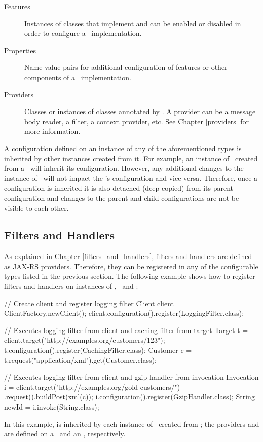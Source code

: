 \begin{description}
\item [Features] Instances of classes that implement  and can be enabled or disabled in order to configure a \jaxrs\ implementation.
\item [Properties] Name-value pairs for additional configuration of features or other components of a \jaxrs\ implementation.
\item [Providers] Classes or instances of classes annotated by \Provider. A provider can be a message body reader, a filter, a context provider, etc. See Chapter \ref{providers} for more information.
\end{description}

A configuration defined on an instance of any of the aforementioned types is inherited by other instances created from it. For example, an instance of \Target\ created from a \Client\ will inherit its configuration. However, any additional changes to the instance of \Target\ will not impact the \Client's configuration and vice versa. Therefore, once a configuration is inherited it is also detached (deep copied) from its parent configuration and changes to the parent and child configurations are not be visible to each other.

\subsection{Filters and Handlers}
\label{filters_handlers_client}

As explained in Chapter \ref{filters_and_handlers}, filters and handlers are defined as JAX-RS providers. Therefore, they can be registered in any of the configurable types listed in the previous section. The following example shows how to register filters and handlers on instances of \Client, \Target\ and \Invocation:

\begin{listing}{1}
// Create client and register logging filter
Client client = ClientFactory.newClient();
client.configuration().register(LoggingFilter.class);

// Executes logging filter from client and caching filter from target
Target t = client.target("http://examples.org/customers/123");
t.configuration().register(CachingFilter.class);
Customer c = t.request("application/xml").get(Customer.class);

// Executes logging filter from client and gzip handler from invocation
Invocation i = client.target("http://examples.org/gold-customers/")
    .request().buildPost(xml(c));
i.configuration().register(GzipHandler.class);
String newId = i.invoke(String.class);
\end{listing}

In this example,  is inherited by each instance of \Target\ created from ; the providers  and  are defined on a \Target\ and an \Invocation, respectively.








